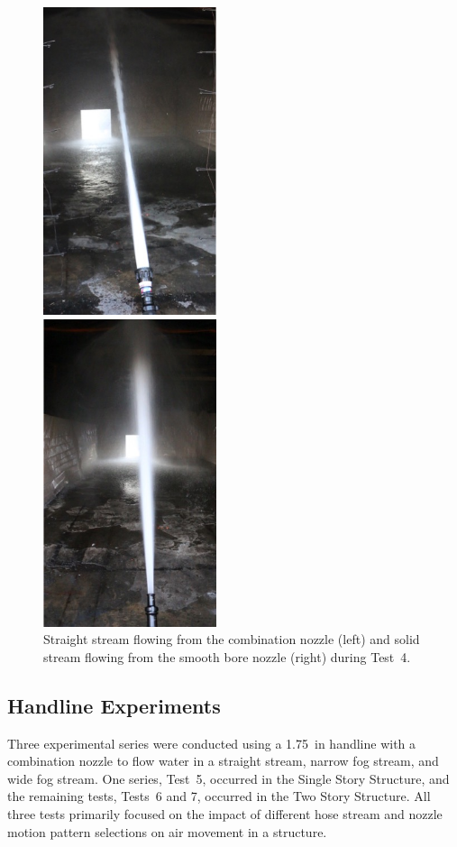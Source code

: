 \documentclass[12pt,oneside]{book}
\begin{document}
\begin{figure}[!ht]
	\minipage{2.15in}
	\begin{center}
		\includegraphics[width=2in]{../Figures/Pictures/SS_70}
	\end{center} 
	\endminipage
	\minipage{2.15in}
	\begin{center}
		\includegraphics[width=2in]{../Figures/Pictures/SB_70}
	\end{center}
	\endminipage
	\caption[Straight stream from combination nozzle and solid stream from smooth bore nozzle with 1~in tip during Test~4.]{Straight stream flowing from the combination nozzle (left) and solid stream flowing from the smooth bore nozzle (right) during Test~4.}
	\label{fig:test_4_pic}
\end{figure}
\FloatBarrier

\subsection{Handline Experiments}
\label{sec:handline_procedure}
Three experimental series were conducted using a 1.75~in handline with a combination nozzle to flow water in a straight stream, narrow fog stream, and wide fog stream. One series, Test~5, occurred in the Single Story Structure, and the remaining tests, Tests~6 and 7, occurred in the Two Story Structure. All three tests primarily focused on the impact of different hose stream and nozzle motion pattern selections on air movement in a structure. 
\end{document}
